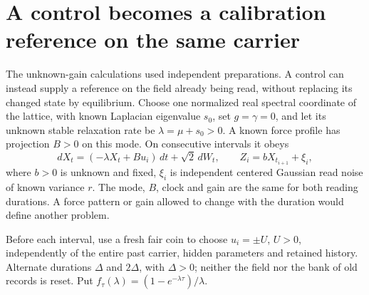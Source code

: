\documentclass[12pt,a4paper]{article}
\begin{document}
\section{A control becomes a calibration reference on the same carrier}
\label{sec:active-reference}

The unknown-gain calculations used independent preparations. A control
can instead supply a reference on the field already being read, without
replacing its changed state by equilibrium. Choose one normalized real
spectral coordinate of the lattice, with known Laplacian eigenvalue
$s_0$, set $g=\gamma=0$, and let its unknown stable relaxation rate be
$\lambda=\mu+s_0>0$. A known force profile has projection $B>0$ on
this mode. On consecutive intervals it obeys
\[
 dX_t=(-\lambda X_t+Bu_i)\,dt+\sqrt2\,dW_t,\qquad
 Z_i=bX_{t_{i+1}}+\xi_i ,
\]
where $b>0$ is unknown and fixed, $\xi_i$ is independent centered
Gaussian read noise of known variance $r$. The mode, $B$, clock and
gain are the same for both reading durations. A force pattern or
gain allowed to change with the duration would define another problem.

Before each interval, use a fresh fair coin to choose $u_i=\pm U$,
$U>0$, independently of the entire past carrier, hidden parameters
and retained history. Alternate durations $\Delta$ and $2\Delta$,
with $\Delta>0$; neither the field nor the bank of old records is
reset. Put $f_\tau(\lambda)=(1-e^{-\lambda\tau})/\lambda$.
\end{document}
